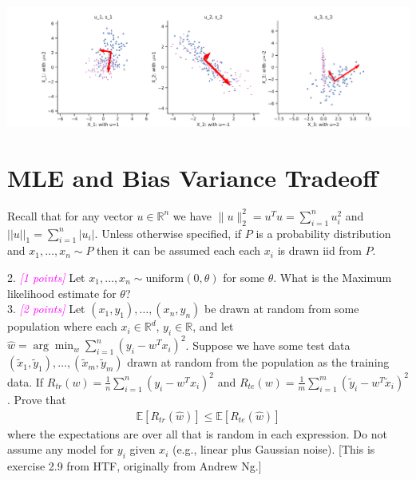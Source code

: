 \documentclass{article}
\newcommand{\1}{\mathbf{1}}
\def\E{\mathbb{E}}
\def\R{\mathbb{R}}
\newcommand{\grade}[1]{\small\textcolor{magenta}{\emph{[#1 points]}} \normalsize}
\begin{document}
\begin{center}
    
\includegraphics[width=7in]{P1.pdf}

\end{center}









\section{MLE and Bias Variance Tradeoff}
Recall that for any vector $u \in \R^n$ we have $\|u\|_2^2 = u^T u = \sum_{i=1}^n u_i^2$ and $||u||_1 = \sum_{i=1}^n |u_i|$. 
Unless otherwise specified, if $P$ is a probability distribution and $x_1,\dots,x_n \sim P$ then it can be assumed each each $x_i$ is drawn iid from $P$. 

2. \grade{1}  Let $x_1,\dots,x_n \sim \text{uniform}(0,\theta)$ for some $\theta$. What is the Maximum likelihood estimate for $\theta$?\\

3. \grade{2} Let $(x_1,y_1),\dots,(x_n,y_n)$ be drawn at random from some population where each $x_i \in \R^d$, $y_i \in \R$, and let $\widehat{w} = \arg\min_w \sum_{i=1}^n (y_i - w^T x_i)^2$.
Suppose we have some test data $(\widetilde{x}_1,\widetilde{y}_1),\dots,(\widetilde{x}_m,\widetilde{y}_m)$ drawn at random from the population as the training data. 
If $R_{tr}(w) = \frac{1}{n} \sum_{i=1}^n (y_i - w^T x_i)^2$ and $R_{te}(w) = \frac{1}{m} \sum_{i=1}^m (\widetilde{y}_i - w^T \widetilde{x}_i)^2$. Prove that 
\begin{align*}
\E[ R_{tr}(\widehat{w}) ] \leq \E[ R_{te}(\widehat{w}) ]
\end{align*}
where the expectations are over all that is random in each expression. Do not assume any model for $y_i$ given $x_i$ (e.g., linear plus Gaussian noise). [This is exercise 2.9 from HTF, originally from Andrew Ng.]\\
\end{document}
